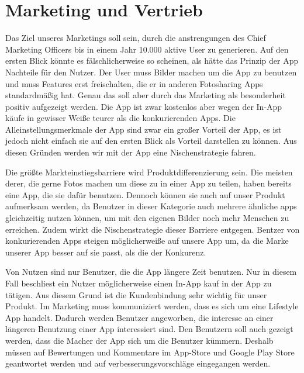 \chapter{Marketing und Vertrieb}
Das Ziel unseres Marketings soll sein, durch die anstrengungen des Chief Marketing Officers bis in einem Jahr 10.000 aktive User zu generieren.
Auf den ersten Blick könnte es fälschlicherweise so scheinen, als hätte das Prinzip der App Nachteile für den Nutzer. Der User muss Bilder machen um die App zu benutzen und muss Features erst freischalten, die er in anderen Fotosharing Apps standardmäßig hat. Genau das soll aber durch das Marketing als besonderheit positiv aufgezeigt werden.
Die App ist zwar kostenlos aber wegen der In-App käufe in gewisser Weiße teurer als die konkurierenden Apps. Die Alleinstellungsmerkmale der App sind zwar ein großer Vorteil der App, es ist jedoch nicht einfach sie auf den ersten Blick als Vorteil darstellen zu können. Aus diesen Gründen werden wir mit der App eine Nischenstrategie fahren.

Die größte Markteinstiegsbarriere wird Produktdifferenzierung sein. Die meisten derer, die gerne Fotos machen um diese zu in einer App zu teilen, haben bereits eine App, die sie dafür benutzen. Dennoch können sie auch auf unser Produkt aufmerksam werden, da Benutzer in dieser Kategorie auch mehrere ähnliche apps gleichzeitig nutzen können, um mit den eigenen Bilder noch mehr Menschen zu erreichen.
Zudem wirkt die Nischenstrategie dieser Barriere entgegen. Bentzer von konkurierenden Apps steigen möglicherweiße auf unsere App um, da die Marke unserer App besser auf sie passt, als die der Konkurenz.

Von Nutzen sind nur Benutzer, die die App längere Zeit benutzen. Nur in diesem Fall beschliest ein Nutzer möglicherweise einen In-App kauf in der App zu tätigen. Aus diesem Grund ist die Kundenbindung sehr wichtig für unser Produkt. Im Marketing muss kommuniziert werden, dass es sich um eine Lifestyle App handelt. Dadurch werden Benutzer angeworben, die interesse an einer längeren Benutzung einer App interessiert sind.
Den Benutzern soll auch gezeigt werden, dass die Macher der App sich um die Benutzer kümmern. Deshalb müssen auf Bewertungen und Kommentare im App-Store und Google Play Store geantwortet werden und auf verbesserungsvorschläge eingegangen werden.

